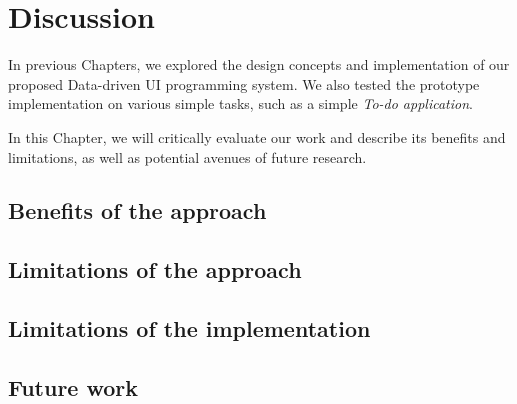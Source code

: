 \chapter{Discussion}
\label{chap:discussion}

In previous Chapters, we explored the design concepts and implementation of our proposed Data-driven UI programming system.
We also tested the prototype implementation on various simple tasks, such as a simple \emph{To-do application}.

In this Chapter, we will critically evaluate our work and describe its benefits and limitations, as well as potential avenues of future research.


\section{Benefits of the approach}

\section{Limitations of the approach}

\section{Limitations of the implementation}

\section{Future work}


